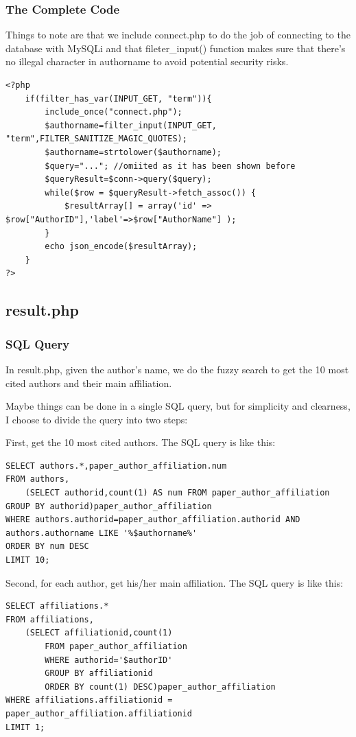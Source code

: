 \documentclass[a4paper]{article}
\begin{document}
            \subsubsection{The Complete Code}
Things to note are that we include connect.php to do the job of connecting to the database with MySQLi and that fileter\_input() function makes sure that there's no illegal character in authorname to avoid potential security risks.
                \begin{verbatim}
<?php
    if(filter_has_var(INPUT_GET, "term")){
        include_once("connect.php");
        $authorname=filter_input(INPUT_GET, "term",FILTER_SANITIZE_MAGIC_QUOTES);
        $authorname=strtolower($authorname);
        $query="..."; //omiited as it has been shown before
        $queryResult=$conn->query($query);
        while($row = $queryResult->fetch_assoc()) {
            $resultArray[] = array('id' => $row["AuthorID"],'label'=>$row["AuthorName"] );
        }
        echo json_encode($resultArray);
    }
?>
                \end{verbatim}
        \subsection{result.php}
            \subsubsection{SQL Query}
In result.php, given the author's name, we do the fuzzy search to get the 10 most cited authors and their main affiliation.

Maybe things can be done in a single SQL query, but for simplicity and clearness, I choose to divide the query into two steps:

First, get the 10 most cited authors. The SQL query is like this:
                \begin{verbatim}
SELECT authors.*,paper_author_affiliation.num
FROM authors,
    (SELECT authorid,count(1) AS num FROM paper_author_affiliation GROUP BY authorid)paper_author_affiliation
WHERE authors.authorid=paper_author_affiliation.authorid AND authors.authorname LIKE '%$authorname%'
ORDER BY num DESC
LIMIT 10;
                \end{verbatim}
Second, for each author, get his/her main affiliation. The SQL query is like this:
                \begin{verbatim}
SELECT affiliations.*
FROM affiliations,
    (SELECT affiliationid,count(1)
        FROM paper_author_affiliation
        WHERE authorid='$authorID'
        GROUP BY affiliationid
        ORDER BY count(1) DESC)paper_author_affiliation
WHERE affiliations.affiliationid = paper_author_affiliation.affiliationid
LIMIT 1;
                \end{verbatim}
\end{document}
